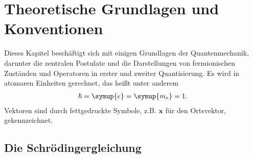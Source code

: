 \chapter{Theoretische Grundlagen und Konventionen}

Dieses Kapitel beschäftigt sich mit einigen Grundlagen der Quantenmechanik, darunter die zentralen Postulate
und die Darstellungen von fermionischen Zuständen und Operatoren in erster und zweiter Quantisierung.
Es wird in atomaren Einheiten gerechnet, das heißt unter anderem
\begin{align}
  \hbar = \symup{e} = \symup{m_e} = 1.
\end{align}
Vektoren sind durch fettgedruckte Symbole, z.B. $\symbf{x}$ für den Ortsvektor, gekennzeichnet.

\section{Die Schrödingergleichung}
\label{sec:schroedingergleichung}


